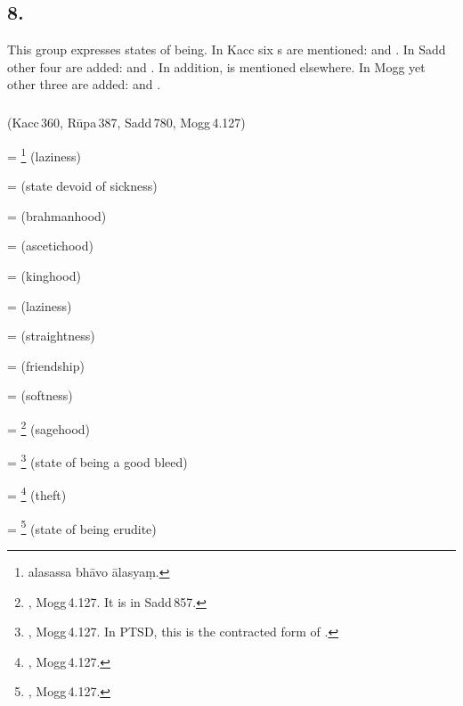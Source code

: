 \subsection*{8.\ }\label{tadgroup8}

This group expresses states of being. In Kacc six s are mentioned:  and . In Sadd other four are added:  and . In addition,  is mentioned elsewhere. In Mogg yet other three are added:  and .

\subparagraph*{} (Kacc\,360, R\=upa\,387, Sadd\,780, Mogg\,4.127)\label{pacct8:dnya}

 = \footnote{alasassa bh\=avo \=alasya\d m.} (laziness) \par
{} =  (state devoid of sickness) \par
{} =  (brahmanhood) \par
{} =  (ascetichood) \par
{} =  (kinghood) \par
{} =  (laziness) \par
{} =  (straightness) \par
{} =  (friendship) \par
{} =  (softness) \par
{} = \footnote{, Mogg\,4.127. It is  in Sadd\,857.} (sagehood) \par
{} = \footnote{, Mogg\,4.127. In PTSD, this is the contracted form of .} (state of being a good bleed) \par
{} = \footnote{, Mogg\,4.127.} (theft) \par
{} = \footnote{, Mogg\,4.127.} (state of being erudite) \par

